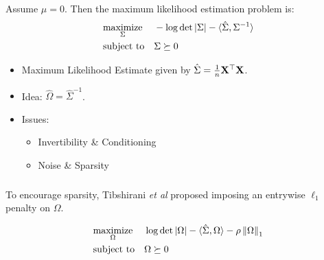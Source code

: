 \begin{frame}[fragile] \frametitle{}
\end{frame}
\begin{frame}[fragile] \frametitle{}

    Assume $\mu = 0$.  Then the maximum likelihood estimation problem is:
	\begin{align*}
		&\underset{\Sigma}{\text{maximize}} && 
			-\log\det|\Sigma| - \langle \hat\Sigma, \Sigma^{-1} \rangle
		\\ &\text{subject to} && \Sigma \succeq 0
	\end{align*}
    \begin{itemize}
        \item Maximum Likelihood Estimate given by $\hat\Sigma = 
            \frac{1}{n} \mathbf{X}^\top \mathbf{X}$.
        \item Idea: $\hat\Omega = \hat\Sigma^{-1}$.
        \item Issues:
            \begin{itemize}
                \item Invertibility \& Conditioning
                \item Noise \& Sparsity
            \end{itemize}
    \end{itemize}
\end{frame}
\begin{frame}[fragile] \frametitle{}

    To encourage sparsity, Tibshirani \textit{et al} proposed imposing an
    entrywise $\ell_1$ penalty on $\Omega$.

    \begin{align*}
        &\underset{\Omega}{\text{maximize}} && 
            \log\det|\Omega| - \langle \hat\Sigma, \Omega \rangle
            - \rho \left\lVert\Omega\right\rVert_1
        \\ &\text{subject to} && \Omega \succeq 0
    \end{align*}
\end{frame}
